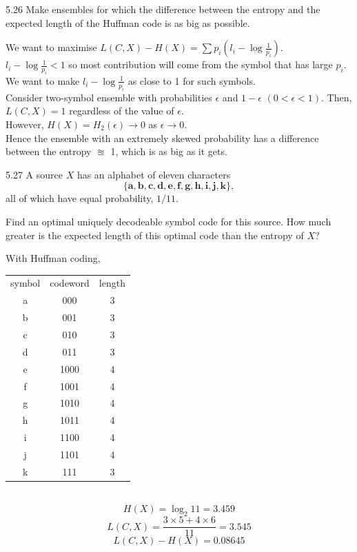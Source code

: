 \documentclass[12pt, a4paper]{article}
\begin{document}
\begin{prob}{5.26}
    Make ensembles for which the difference between the entropy and the expected length of the Huffman code is as big as possible.
\end{prob}
\begin{sol}
    We want to maximise $L(C, X) - H(X) = \sum p_i (l_i - \log\frac{1}{p_i})$. \\
    $l_i - \log\frac{1}{p_i} < 1$ so most contribution will come from the symbol that has large $p_i$. We want to make $l_i - \log\frac{1}{p_i}$ as close to 1 for such symbols. \\
    Consider two-symbol ensemble with probabilities $\epsilon$ and $1-\epsilon$ $(0 < \epsilon < 1)$. Then, $L(C, X) = 1$ regardless of the value of $\epsilon$. \\
    However, $H(X) = H_2(\epsilon) \rightarrow 0$ as $\epsilon \rightarrow 0$. \\
    Hence the ensemble with an extremely skewed probability has a difference between the entropy $\approxeq$ 1, which is as big as it gets. 
\end{sol}

\begin{prob}{5.27}
    A source $X$ has an alphabet of eleven characters
\[
\{\mathbf{a}, \mathbf{b}, \mathbf{c}, \mathbf{d}, \mathbf{e}, \mathbf{f}, \mathbf{g}, \mathbf{h}, \mathbf{i}, \mathbf{j}, \mathbf{k}\},
\]
all of which have equal probability, $1/11$.

\noindent Find an optimal uniquely decodeable symbol code for this source. How much greater is the expected length of this optimal code than the entropy of $X$?
\end{prob}
\begin{sol}
With Huffman coding, \\
\begin{tabular}{ c c c }
    symbol & codeword & length \\
    a & 000 & 3 \\
    b & 001 & 3 \\
    c & 010 & 3 \\
    d & 011 & 3 \\
    e & 1000 & 4 \\
    f & 1001 & 4 \\
    g & 1010 & 4 \\
    h & 1011 & 4 \\
    i & 1100 & 4 \\
    j & 1101 & 4 \\
    k & 111 & 3
\end{tabular}\\

$$H(X) = \log_2 11 = 3.459$$
$$L(C, X) = \frac{3 \times 5 + 4 \times 6}{11} = 3.545$$
$$L(C, X) - H(X) = 0.08645$$
\end{sol}
\bigskip
\end{document}
